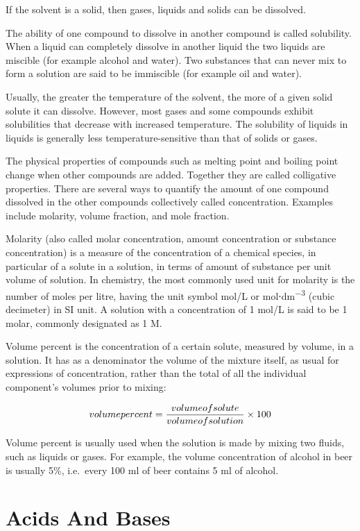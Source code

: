 \documentclass[
]{book}
\begin{document}
If the solvent is a solid, then gases, liquids and solids can be dissolved.

The ability of one compound to dissolve in another compound is called solubility. When a liquid can completely dissolve in another liquid the two liquids are miscible (for example alcohol and water). Two substances that can never mix to form a solution are said to be immiscible (for example oil and water).

Usually, the greater the temperature of the solvent, the more of a given solid solute it can dissolve. However, most gases and some compounds exhibit solubilities that decrease with increased temperature. The solubility of liquids in liquids is generally less temperature-sensitive than that of solids or gases.

The physical properties of compounds such as melting point and boiling point change when other compounds are added. Together they are called colligative properties. There are several ways to quantify the amount of one compound dissolved in the other compounds collectively called concentration. Examples include molarity, volume fraction, and mole fraction.

Molarity (also called molar concentration, amount concentration or substance concentration) is a measure of the concentration of a chemical species, in particular of a solute in a solution, in terms of amount of substance per unit volume of solution. In chemistry, the most commonly used unit for molarity is the number of moles per litre, having the unit symbol mol/L or mol⋅dm\textsuperscript{−3} (cubic decimeter) in SI unit. A solution with a concentration of 1 mol/L is said to be 1 molar, commonly designated as 1 M.

Volume percent is the concentration of a certain solute, measured by volume, in a solution. It has as a denominator the volume of the mixture itself, as usual for expressions of concentration, rather than the total of all the individual component's volumes prior to mixing:

\[ volume \space percent=\frac{volume \space of \space solute}{volume \space of \space solution} \times 100 \]

Volume percent is usually used when the solution is made by mixing two fluids, such as liquids or gases. For example, the volume concentration of alcohol in beer is usually 5\%, i.e.~every 100 ml of beer contains 5 ml of alcohol.

\hypertarget{acids-and-bases}{%
\section{Acids And Bases}\label{acids-and-bases}}
\end{document}
